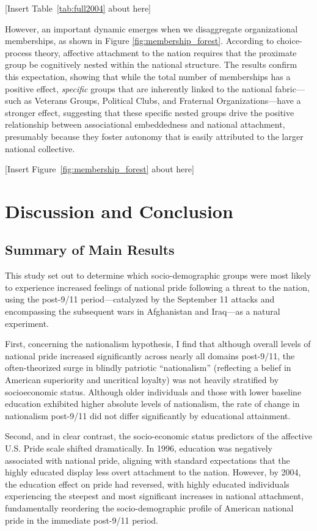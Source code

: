\documentclass[12pt,letterpaper]{article}
\begin{document}
[Insert Table~\ref{tab:full2004} about here]

However, an important dynamic emerges when we disaggregate organizational memberships, as shown in Figure \ref{fig:membership_forest}. According to choice-process theory, affective attachment to the nation requires that the proximate group be cognitively nested within the national structure. The results confirm this expectation, showing that while the total number of memberships has a positive effect, \textit{specific} groups that are inherently linked to the national fabric---such as Veterans Groups, Political Clubs, and Fraternal Organizations---have a stronger effect, suggesting that these specific nested groups drive the positive relationship between associational embeddedness and national attachment, presumably because they foster autonomy that is easily attributed to the larger national collective.

[Insert Figure~\ref{fig:membership_forest} about here]

\section{Discussion and Conclusion}

\subsection{Summary of Main Results}
This study set out to determine which socio-demographic groups were most likely to experience increased feelings of national pride following a threat to the nation, using the post-9/11 period---catalyzed by the September 11 attacks and encompassing the subsequent wars in Afghanistan and Iraq---as a natural experiment.

First, concerning the nationalism hypothesis, I find that although overall levels of national pride increased significantly across nearly all domains post-9/11, the often-theorized surge in blindly patriotic ``nationalism'' (reflecting a belief in American superiority and uncritical loyalty) was not heavily stratified by socioeconomic status. Although older individuals and those with lower baseline education exhibited higher absolute levels of nationalism, the rate of change in nationalism post-9/11 did not differ significantly by educational attainment.

Second, and in clear contrast, the socio-economic status predictors of the affective U.S. Pride scale shifted dramatically. In 1996, education was negatively associated with national pride, aligning with standard expectations that the highly educated display less overt attachment to the nation. However, by 2004, the education effect on pride had reversed, with highly educated individuals experiencing the steepest and most significant increases in national attachment, fundamentally reordering the socio-demographic profile of American national pride in the immediate post-9/11 period.
\end{document}
